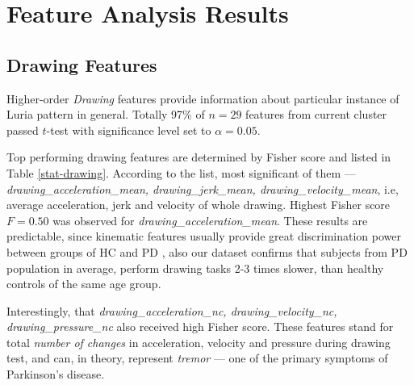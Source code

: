 
\section{Feature Analysis Results}

\subsection{Drawing Features}

Higher-order \textit{Drawing} features provide information about particular instance of Luria pattern in general. Totally 97\% of $n=29$ features from current cluster passed $t$-test with significance level set to $\alpha = 0.05$. 

Top performing drawing features are determined by Fisher score and listed in Table \ref{stat-drawing}. According to the list, most significant of them --- \textit{drawing\_acceleration\_mean, drawing\_jerk\_mean, drawing\_velocity\_mean}, i.e, average acceleration, jerk and velocity of whole drawing. Highest Fisher score $F =0.50$ was observed for \textit{drawing\_acceleration\_mean}. These results are predictable, since kinematic features usually provide great discrimination power between groups of HC and PD \cite{raudmann2014handwriting, letanneux2014micrographia, pinto2015handwriting}, also our dataset confirms that subjects from PD population in average, perform drawing tasks 2-3 times slower, than healthy controls of the same age group.

Interestingly, that \textit{drawing\_acceleration\_nc, drawing\_velocity\_nc, drawing\_pressure\_nc} also received high Fisher score. These features stand for total \textit{number of changes} in acceleration, velocity and pressure during drawing test, and can, in theory, represent \textit{tremor} --- one of the primary symptoms of Parkinson's disease.

